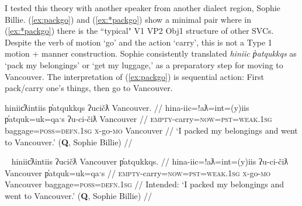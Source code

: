 I tested this theory with another speaker from another dialect region, Sophie Billie. (\ref{ex:packgo}) and (\ref{ex:*packgo}) show a minimal pair where in (\ref{ex:*packgo}) there is the ``typical" V1 VP2 Obj1 structure of other SVCs. Despite the verb of motion `go' and the action `carry', this is not a Type 1 motion + manner construction. Sophie consistently translated \textit{hiniic p̓atqukkqs} as `pack my belongings' or `get my luggage,' as a preparatory step for moving to Vancouver. The interpretation of (\ref{ex:packgo}) is sequential action: First pack/carry one's things, then go to Vancouver.

\ex \label{ex:packgo}
\begingl
\glpreamble hiniic̓ƛintiis p̓atqukkqs ʔucičƛ Vancouver. //
\gla hina-iic=!aƛ=int=(y)iis p̓atquk=uk=qaˑs ʔu-ci-čiƛ Vancouver //
\glb \textsc{empty}-carry=\textsc{now}=\textsc{pst}=\textsc{weak.1sg} baggage=\textsc{poss}=\textsc{defn.1sg} \textsc{x}-go-\textsc{mo} Vancouver //
\glft `I packed my belongings and went to Vancouver.' (\textbf{Q}, Sophie Billie) //
\endgl
\xe

\ex~ \label{ex:*packgo}
\begingl
\glpreamble hiniic̓ƛintiis ʔucičƛ Vancouver p̓atqukkqs. //
\gla hina-iic=!aƛ=int=(y)iis ʔu-ci-čiƛ Vancouver p̓atquk=uk=qaˑs //
\glb \textsc{empty}-carry=\textsc{now}=\textsc{pst}=\textsc{weak.1sg} \textsc{x}-go-\textsc{mo} Vancouver baggage=\textsc{poss}=\textsc{defn.1sg} //
\glft Intended: `I packed my belongings and went to Vancouver.' (\textbf{Q}, Sophie Billie) //
\endgl
\xe


\begin{comment}
actions performed while changing locations (e.g., carry + go as in \ref{ex:carryluggage}),

\ex~ \label{ex:carryluggage}
\begingl
\glpreamble hiniic̓aƛna p̓atquk ʔucačiƛ Qualicum. //
\gla hina-iic=!aƛ=naˑ p̓atquk ʔu-ca-čiƛ Qualicum //
\glb \textsc{empty}-carry=\textsc{now}=\textsc{strg.1pl} belongings \textsc{x}-go.to-\textsc{mo} Qualicum //
\glft `We are taking our belongings going to Qualicum.' (\textbf{C}, \textit{tupaat} Julia Lucas) //
\endgl
\xe 
\end{comment}


